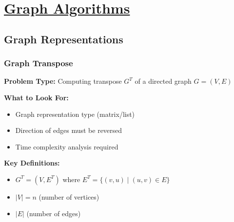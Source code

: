 
\section{\texorpdfstring{\underline{Graph Algorithms}}{Graph Algorithms}}
\subsection{Graph Representations}
\subsubsection{Graph Transpose}
\textbf{Problem Type:} Computing transpose $G^T$ of a directed graph $G=(V,E)$

\textbf{What to Look For:}
\begin{itemize}[noitemsep,leftmargin=*]
    \item Graph representation type (matrix/list)
    \item Direction of edges must be reversed
    \item Time complexity analysis required
\end{itemize}

\textbf{Key Definitions:}
\begin{itemize}[noitemsep,leftmargin=*]
    \item $G^T = (V,E^T)$ where $E^T = \{(v,u) \mid (u,v) \in E\}$
    \item $|V| = n$ (number of vertices)
    \item $|E|$ (number of edges)
\end{itemize}

